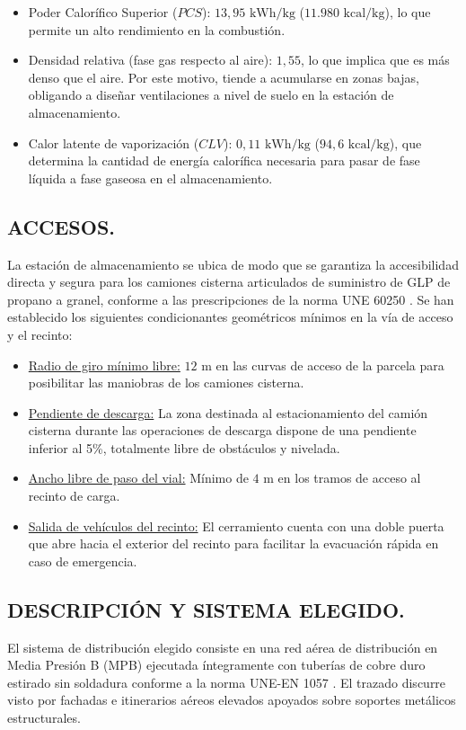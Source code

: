 \documentclass[12pt]{article}
\begin{document}
        \begin{itemize}
            \item Poder Calorífico Superior ($PCS$): $13,95\text{ kWh/kg}$ ($11.980\text{ kcal/kg}$), lo que permite un alto rendimiento en la combustión.
            \item Densidad relativa (fase gas respecto al aire): $1,55$, lo que implica que es más denso que el aire. Por este motivo, tiende a acumularse en zonas bajas, obligando a diseñar ventilaciones a nivel de suelo en la estación de almacenamiento.
            \item Calor latente de vaporización ($CLV$): $0,11\text{ kWh/kg}$ ($94,6\text{ kcal/kg}$), que determina la cantidad de energía calorífica necesaria para pasar de fase líquida a fase gaseosa en el almacenamiento.
        \end{itemize}

        \subsection{ACCESOS.}
        La estación de almacenamiento se ubica de modo que se garantiza la accesibilidad directa y segura para los camiones cisterna articulados de suministro de GLP de propano a granel, conforme a las prescripciones de la norma UNE 60250 \cite{une60250}. Se han establecido los siguientes condicionantes geométricos mínimos en la vía de acceso y el recinto:
        
        \begin{itemize}
            \item \underline{Radio de giro mínimo libre:} $12\text{ m}$ en las curvas de acceso de la parcela para posibilitar las maniobras de los camiones cisterna.
            \item \underline{Pendiente de descarga:} La zona destinada al estacionamiento del camión cisterna durante las operaciones de descarga dispone de una pendiente inferior al 5\%, totalmente libre de obstáculos y nivelada.
            \item \underline{Ancho libre de paso del vial:} Mínimo de $4\text{ m}$ en los tramos de acceso al recinto de carga.
            \item \underline{Salida de vehículos del recinto:} El cerramiento cuenta con una doble puerta que abre hacia el exterior del recinto para facilitar la evacuación rápida en caso de emergencia.
        \end{itemize}

        \subsection{DESCRIPCIÓN Y SISTEMA ELEGIDO.}
        El sistema de distribución elegido consiste en una red aérea de distribución en Media Presión B (MPB) ejecutada íntegramente con tuberías de cobre duro estirado sin soldadura conforme a la norma UNE-EN 1057 \cite{une1057}. El trazado discurre visto por fachadas e itinerarios aéreos elevados apoyados sobre soportes metálicos estructurales.
        
\end{document}
